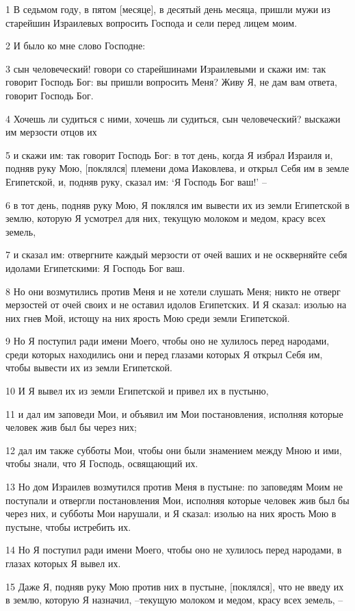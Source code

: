 \par 1 В седьмом году, в пятом [месяце], в десятый день месяца, пришли мужи из старейшин Израилевых вопросить Господа и сели перед лицем моим.
\par 2 И было ко мне слово Господне:
\par 3 сын человеческий! говори со старейшинами Израилевыми и скажи им: так говорит Господь Бог: вы пришли вопросить Меня? Живу Я, не дам вам ответа, говорит Господь Бог.
\par 4 Хочешь ли судиться с ними, хочешь ли судиться, сын человеческий? выскажи им мерзости отцов их
\par 5 и скажи им: так говорит Господь Бог: в тот день, когда Я избрал Израиля и, подняв руку Мою, [поклялся] племени дома Иаковлева, и открыл Себя им в земле Египетской, и, подняв руку, сказал им: `Я Господь Бог ваш!' --
\par 6 в тот день, подняв руку Мою, Я поклялся им вывести их из земли Египетской в землю, которую Я усмотрел для них, текущую молоком и медом, красу всех земель,
\par 7 и сказал им: отвергните каждый мерзости от очей ваших и не оскверняйте себя идолами Египетскими: Я Господь Бог ваш.
\par 8 Но они возмутились против Меня и не хотели слушать Меня; никто не отверг мерзостей от очей своих и не оставил идолов Египетских. И Я сказал: изолью на них гнев Мой, истощу на них ярость Мою среди земли Египетской.
\par 9 Но Я поступил ради имени Моего, чтобы оно не хулилось перед народами, среди которых находились они и перед глазами которых Я открыл Себя им, чтобы вывести их из земли Египетской.
\par 10 И Я вывел их из земли Египетской и привел их в пустыню,
\par 11 и дал им заповеди Мои, и объявил им Мои постановления, исполняя которые человек жив был бы через них;
\par 12 дал им также субботы Мои, чтобы они были знамением между Мною и ими, чтобы знали, что Я Господь, освящающий их.
\par 13 Но дом Израилев возмутился против Меня в пустыне: по заповедям Моим не поступали и отвергли постановления Мои, исполняя которые человек жив был бы через них, и субботы Мои нарушали, и Я сказал: изолью на них ярость Мою в пустыне, чтобы истребить их.
\par 14 Но Я поступил ради имени Моего, чтобы оно не хулилось перед народами, в глазах которых Я вывел их.
\par 15 Даже Я, подняв руку Мою против них в пустыне, [поклялся], что не введу их в землю, которую Я назначил, --текущую молоком и медом, красу всех земель, --
